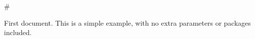 \documentclass{article}
\begin{document}
                    
                    #     
                        
                        First document. This is a simple example, with no 
                        extra parameters or packages included.
                        
\end{document}
